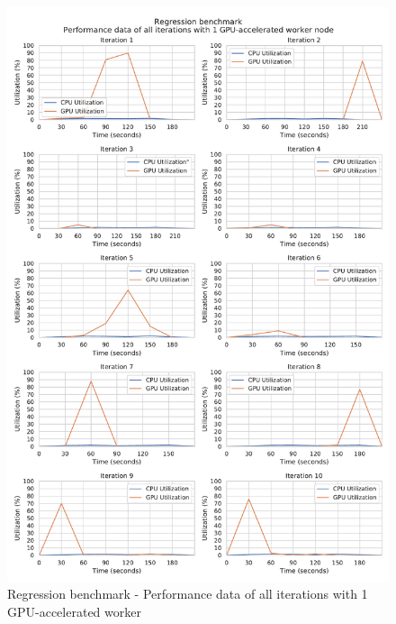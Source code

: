 \begin{figure}[h]
\centering
\includegraphics[scale=0.5]{images/appendix/evaluation_data/regression_benchmark/regression_gpu1_performance}
\caption{Regression benchmark - Performance data of all iterations with 1 GPU-accelerated worker}
\label{fig:appendix_eval_regression_gpu1}
\end{figure}

